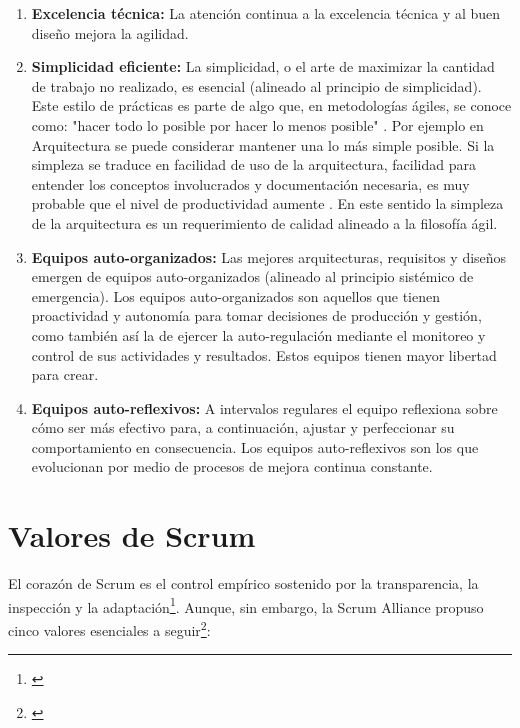 \begin{enumerate}
\item \textbf{Excelencia técnica:} La atención continua a la excelencia técnica y al buen diseño mejora la agilidad.

\item \textbf{Simplicidad eficiente:} La simplicidad, o el arte de maximizar la cantidad de trabajo no realizado, es esencial (alineado al principio de simplicidad). Este estilo de prácticas es parte de algo que, en metodologías ágiles, se conoce como: "hacer todo lo posible por hacer lo menos posible" \cite{Anacleto-2005}. Por ejemplo en Arquitectura se puede considerar mantener una lo más simple posible. Si la simpleza se traduce en facilidad de uso de la arquitectura, facilidad para entender los conceptos involucrados y documentación necesaria, es muy probable que el nivel de productividad aumente \cite{Anacleto-2005}. En este sentido la simpleza de la arquitectura es un requerimiento de calidad alineado a la filosofía ágil.

\item \textbf{Equipos auto-organizados:} Las mejores arquitecturas, requisitos y diseños emergen de equipos auto-organizados (alineado al principio sistémico de emergencia). Los equipos auto-organizados son aquellos que tienen proactividad y autonomía para tomar decisiones de producción y gestión, como también así la de ejercer la auto-regulación mediante el monitoreo y control de sus actividades y resultados. Estos equipos tienen mayor libertad para crear.

\item \textbf{Equipos auto-reflexivos:} A intervalos regulares el equipo reflexiona sobre cómo ser más efectivo para, a continuación, ajustar y perfeccionar su comportamiento en consecuencia. Los equipos auto-reflexivos son los que evolucionan por medio de procesos de mejora continua constante.

\end{enumerate}

\section{Valores de Scrum}

El corazón de Scrum es el control empírico sostenido por la transparencia, la inspección y la adaptación\footnote{\cite{Ken-Jeff-2013}}. Aunque, sin embargo, la Scrum Alliance propuso cinco valores esenciales a seguir\footnote{\cite{Scrum-Alliance-2015}}: 

